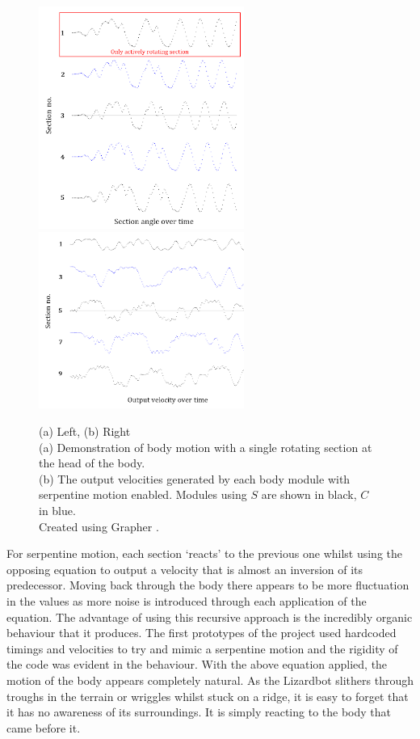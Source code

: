\documentclass{article}
\begin{document}
\begin{figure}[H]
\centering
\centerline{
\includegraphics[width=0.6\textwidth]{cpgMirroring}
\includegraphics[width=0.6\textwidth]{cpgSerpentine}
}
\caption{(a) Left, (b) Right\\
(a) Demonstration of body motion with a single rotating section at the head of the body.\\
(b) The output velocities generated by each body module with serpentine motion enabled. Modules using $S$ are shown in black, $C$ in blue.\\
Created using Grapher \citep{grapher}.}
\label{fig:bodyOutput}
\end{figure}

For serpentine motion, each section ‘reacts’ to the previous one whilst using the opposing equation to output a velocity that is almost an inversion of its predecessor. Moving back through the body there appears to be more fluctuation in the values as more noise is introduced through each application of the equation. The advantage of using this recursive approach is the incredibly organic behaviour that it produces. The first prototypes of the project used hardcoded timings and velocities to try and mimic a serpentine motion and the rigidity of the code was evident in the behaviour. With the above equation applied, the motion of the body appears completely natural. As the Lizardbot slithers through troughs in the terrain or wriggles whilst stuck on a ridge, it is easy to forget that it has no awareness of its surroundings. It is simply reacting to the body that came before it.
\end{document}
